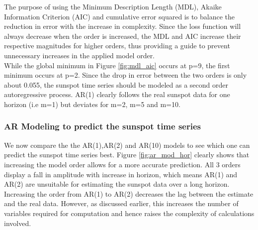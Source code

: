 \documentclass{article}
\begin{document}
The purpose of using the Minimum Description Length (MDL), Akaike Information Criterion (AIC) and cumulative error squared is to balance the reduction in error with the increase in complexity. Since the loss function will always decrease when the order is increased, the MDL and AIC increase their respective magnitudes for higher orders, thus providing a guide to prevent unnecessary increases in the applied model order.\\

While the global minimum in Figure \ref{fig:mdl_aic} occurs at p=9, the first minimum occurs at p=2. Since the drop in error between the two orders is only about 0.055, the sunspot time series should be modeled as a second order autoregressive process. AR(1) clearly follows the real sunspot data for one horizon (i.e m=1) but deviates for m=2, m=5 and m=10.

\pagebreak

\subsubsection{AR Modeling to predict the sunspot time series}

We now compare the the AR(1),AR(2) and AR(10) models to see which one can predict the sunspot time series best. Figure \ref{fig:ar_mod_hor} clearly shows that increasing the model order allows for a more accurate prediction. All 3 orders display a fall in amplitude with increase in horizon, which means AR(1) and AR(2) are unsuitable for estimating the sunspot data over a long horizon. Increasing the order from AR(1) to AR(2) decreases the lag between the estimate and the real data. However, as discussed earlier, this increases the number of variables required for computation and hence raises the complexity of calculations involved.
\end{document}
